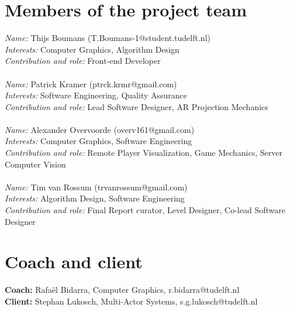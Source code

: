 \documentclass[]{article}
\begin{document}
\section*{Members of the project team}
\textit{Name:} Thijs Boumans (T.Boumans-1@student.tudelft.nl)\\
\textit{Interests:} Computer Graphics, Algorithm Design \\
\textit{Contribution and role:} Front-end Developer \\
\\
\textit{Name:} Patrick Kramer (ptrck.krmr@gmail.com) \\
\textit{Interests:} Software Engineering, Quality Assurance \\
\textit{Contribution and role:} Lead Software Designer, AR Projection Mechanics \\
\\
\textit{Name:} Alexander Overvoorde (overv161@gmail.com)\\
\textit{Interests:} Computer Graphics, Software Engineering\\
\textit{Contribution and role:} Remote Player Visualization, Game Mechanics, Server Computer Vision\\
\\
\textit{Name:} Tim van Rossum (trvanrossum@gmail.com)\\
\textit{Interests:} Algorithm Design, Software Engineering \\
\textit{Contribution and role:} Final Report curator, Level Designer, Co-lead Software Designer \\

\section*{Coach and client}
\textbf{Coach:} Rafa\"el Bidarra, Computer Graphics, r.bidarra@tudelft.nl\\
\textbf{Client:} Stephan Lukosch, Multi-Actor Systems, s.g.lukosch@tudelft.nl
\end{document}
